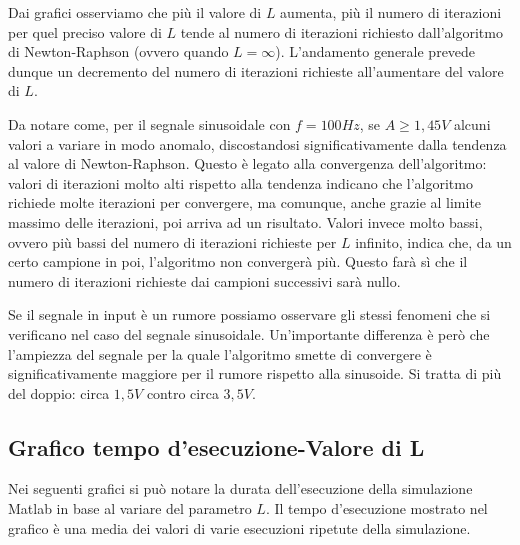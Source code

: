 			Dai grafici osserviamo che più il valore di $L$ aumenta, più il numero di iterazioni per quel preciso valore di $L$ tende al numero di iterazioni richiesto dall'algoritmo di Newton-Raphson (ovvero quando $L = \infty$). L'andamento generale prevede dunque un decremento del numero di iterazioni richieste all'aumentare del valore di $L$.
			
			Da notare come, per il segnale sinusoidale con $f = 100Hz$, se $A \ge 1,45V$ alcuni valori a variare in modo anomalo, discostandosi significativamente dalla tendenza al valore di Newton-Raphson. Questo è legato alla convergenza dell'algoritmo: valori di iterazioni molto alti rispetto alla tendenza indicano che l'algoritmo richiede molte iterazioni per convergere, ma comunque, anche grazie al limite massimo delle iterazioni, poi arriva ad un risultato. Valori invece molto bassi, ovvero più bassi del numero di iterazioni richieste per $L$ infinito, indica che, da un certo campione in poi, l'algoritmo non convergerà più. Questo farà sì che il numero di iterazioni richieste dai campioni successivi sarà nullo.
			
			\graficospace
			\graficospace
			\graficospace
			
			Se il segnale in input è un rumore possiamo osservare gli stessi fenomeni che si verificano nel caso del segnale sinusoidale. Un'importante differenza è però che l'ampiezza del segnale per la quale l'algoritmo smette di convergere è significativamente maggiore per il rumore rispetto alla sinusoide. Si tratta di più del doppio: circa $1,5V$ contro circa $3,5V$.
			\pagebreak
			
		\subsection{Grafico tempo d'esecuzione-Valore di L}
			\label{subsec:tempo_esecuzione}
			Nei seguenti grafici si può notare la durata dell'esecuzione della simulazione Matlab in base al variare del parametro $L$. Il tempo d'esecuzione mostrato nel grafico è una media dei valori di varie esecuzioni ripetute della simulazione.
			
			\graficospace
			
